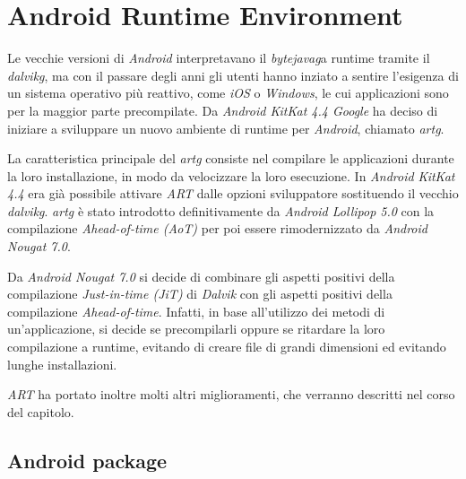 
\chapter{Android Runtime Environment}
\label{chap:art}

Le vecchie versioni di \emph{Android} interpretavano il \emph{\gls{bytejavag}}\glsfirstoccurspace a runtime tramite il \emph{\gls{dalvikg}}\glsfirstoccur, ma con il passare degli anni gli utenti hanno inziato a sentire l'esigenza di un sistema operativo più reattivo, come \emph{iOS} o \emph{Windows}, le cui applicazioni sono per la maggior parte precompilate. Da \emph{Android KitKat 4.4 Google} ha deciso di iniziare a sviluppare un nuovo ambiente di runtime per \emph{Android}, chiamato \emph{\gls{artg}}.

La caratteristica principale del \emph{\gls{artg}} consiste nel compilare le applicazioni durante la loro installazione, in modo da velocizzare la loro esecuzione. In \emph{Android KitKat 4.4} era già possibile attivare \emph{ART} dalle opzioni sviluppatore sostituendo il vecchio \emph{\gls{dalvikg}}. \emph{\gls{artg}} è stato introdotto definitivamente da \emph{Android Lollipop 5.0} con la compilazione \emph{Ahead-of-time (AoT)} per poi essere rimodernizzato da \emph{Android Nougat 7.0}.

Da \emph{Android Nougat 7.0} si decide di combinare gli aspetti positivi della compilazione \emph{Just-in-time (JiT)} di \emph{Dalvik} con gli aspetti positivi della compilazione \emph{Ahead-of-time}. Infatti, in base all'utilizzo dei metodi di un'applicazione, si decide se precompilarli oppure se ritardare la loro compilazione a runtime, evitando di creare file di grandi dimensioni ed evitando lunghe installazioni.

\emph{ART} ha portato inoltre molti altri miglioramenti, che verranno descritti nel corso del capitolo.

\newpage

\section{Android package}

